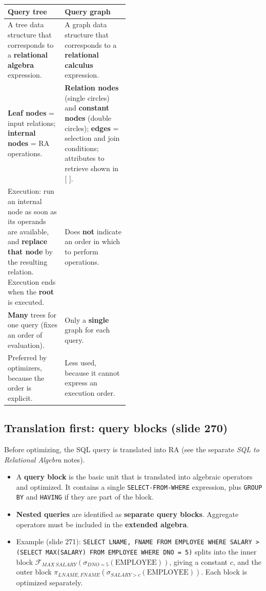 \documentclass[10pt,a4paper]{article}
\newcommand{\R}[1]{\mathrm{#1}}
\begin{document}
\begin{tabularx}{\linewidth}{@{}p{0.47\linewidth} X@{}}
\toprule
\textbf{Query tree} & \textbf{Query graph}\\\midrule
A tree data structure that corresponds to a \textbf{relational algebra} expression. & A graph data structure that corresponds to a \textbf{relational calculus} expression.\\
\textbf{Leaf nodes} = input relations; \textbf{internal nodes} = RA operations. & \textbf{Relation nodes} (single circles) and \textbf{constant nodes} (double circles); \textbf{edges} = selection and join conditions; attributes to retrieve shown in [ ].\\
Execution: run an internal node as soon as its operands are available, and \textbf{replace that node} by the resulting relation. Execution ends when the \textbf{root} is executed. & Does \textbf{not} indicate an order in which to perform operations.\\
\textbf{Many} trees for one query (fixes an order of evaluation). & Only a \textbf{single} graph for each query.\\
Preferred by optimizers, because the order is explicit. & Less used, because it cannot express an execution order.\\
\bottomrule
\end{tabularx}

\subsection{Translation first: query blocks (slide 270)}
Before optimizing, the SQL query is translated into RA (see the separate \emph{SQL to Relational Algebra} notes).
\begin{itemize}
  \item A \textbf{query block} is the basic unit that is translated into algebraic operators and optimized. It contains a single \texttt{SELECT-FROM-WHERE} expression, plus \texttt{GROUP BY} and \texttt{HAVING} if they are part of the block.
  \item \textbf{Nested queries} are identified as \textbf{separate query blocks}. Aggregate operators must be included in the \textbf{extended algebra}.
  \item Example (slide 271): \texttt{SELECT LNAME, FNAME FROM EMPLOYEE WHERE SALARY > (SELECT MAX(SALARY) FROM EMPLOYEE WHERE DNO = 5)} splits into the inner block $\mathcal{F}_{MAX\ SALARY}(\sigma_{DNO=5}(\R{EMPLOYEE}))$, giving a constant $c$, and the outer block $\pi_{LNAME,FNAME}(\sigma_{SALARY>c}(\R{EMPLOYEE}))$. Each block is optimized separately.
\end{itemize}
\end{document}
